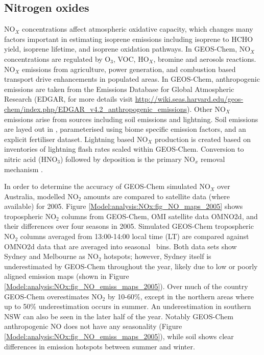   \subsection{Nitrogen oxides}
    \label{Model:GC:NOx}
    NO$_X$ concentrations affect atmospheric oxidative capacity, which changes many factors important in estimating isoprene emissions including isoprene to HCHO yield, isoprene lifetime, and isoprene oxidation pathways.
    In GEOS-Chem, NO$_X$ concentrations are regulated by O$_3$, VOC, HO$_X$, bromine and aerosols reactions.
    NO$_X$ emissions from agriculture, power generation, and combustion based transport drive enhancements in populated areas.
    In GEOS-Chem, anthropogenic emissions are taken from the Emissions Database for Global Atmospheric Research (EDGAR, for more details visit \url{http://wiki.seas.harvard.edu/geos-chem/index.php/EDGAR_v4.2_anthropogenic_emissions}).
    Other NO$_X$ emissions arise from sources including soil emissions %
    and lightning.
    Soil emissions are layed out in \textcite{Hudson2012}, parameterised using biome specific emission factors, and an explicit fertiliser dataset.
    Lightning based NO$_X$ production is created based on inventories of lightning flash rates scaled within GEOS-Chem.
    Conversion to nitric acid (HNO$_3$) followed by deposition is the primary NO$_x$ removal mechanism \parencite{Delmas1997, Ayers2006}.
    
    In order to determine the accuracy of GEOS-Chem simulated NO$_X$ over Australia, modelled NO$_2$ amounts are compared to satellite data (where available) for 2005.
    Figure \ref{Model:analysis:NOx:fig_NO_maps_2005} shows tropospheric NO$_2$ columns from GEOS-Chem, OMI satellite data OMNO2d, and their differences over four seasons in 2005.
    Simulated GEOS-Chem tropospheric NO$_2$ columns averaged from 13:00-14:00 local time (LT) are compared against OMNO2d data that are averaged into seasonal \lowhr ~bins. %
    Both data sets show Sydney and Melbourne as NO$_2$ hotspots; however, Sydney itself is underestimated by GEOS-Chem throughout the year, likely due to low or poorly aligned emission maps (shown in Figure \ref{Model:analysis:NOx:fig_NO_emiss_maps_2005}).
    Over much of the country GEOS-Chem overestimates NO$_2$ by 10-60\%, except in the northern areas where up to 50\% underestimation occurs in summer.
    An underestimation in southern NSW can also be seen in the later half of the year.
    Notably GEOS-Chem anthropogenic NO does not have any seasonality (Figure \ref{Model:analysis:NOx:fig_NO_emiss_maps_2005}), while soil shows clear differences in emission hotspots between summer and winter.
    
